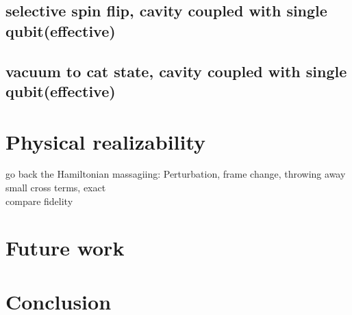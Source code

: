 \documentclass{article}
\begin{document}
\subsection{selective spin flip, cavity coupled with single qubit(effective)}

\subsection{vacuum to cat state, cavity coupled with single qubit(effective)}

\section{Physical realizability}
go back the Hamiltonian massagiing: Perturbation, frame change, throwing away small cross terms, exact \\
compare fidelity

\section{Future work}

\section{Conclusion}
\end{document}
